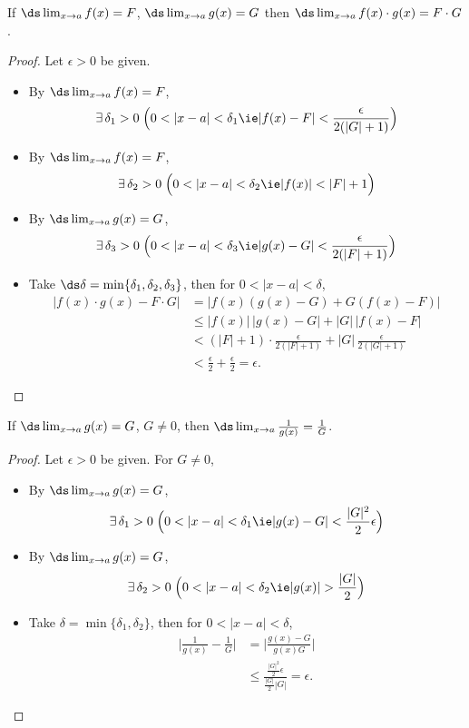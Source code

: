 \begin{theorem}
  If $\ds\lim_{x\to a}f(x) = F$, $\ds\lim_{x\to a}g(x) = G$ then $\ds\lim_{x\to a} f(x)\cdot g(x) = F\cdot G$.
\end{theorem}
\begin{proof}
  Let $\epsilon > 0$ be given.
  \begin{itemize}
    \item By $\ds\lim_{x\to a}f(x) = F$, $$\exists\,\delta_1 > 0\;\Big(0 < |x - a| < \delta_1 \ie |f(x) - F| < \frac{\epsilon}{2(|G| + 1)}\Big)$$
    \item By $\ds\lim_{x\to a}f(x) = F$, $$\exists\,\delta_2 > 0\;\Big(0 < |x - a| < \delta_2 \ie |f(x)| < |F| + 1\Big)$$
    \item By $\ds\lim_{x\to a}g(x) = G$, $$\exists\,\delta_3 > 0\;\Big(0 < |x - a| < \delta_3 \ie |g(x) - G| < \frac{\epsilon}{2(|F| + 1)}\Big)$$
    \item Take $\ds\delta = \min\{\delta_1, \delta_2, \delta_3\}$, then for $ 0 < |x - a| < \delta$,
      \begin{align*}
        |f(x)\cdot g(x) - F\cdot G| &= |f(x)(g(x) - G) + G(f(x) - F)| \\
        &\leqslant |f(x)|\,|g(x) - G| + |G|\,|f(x) - F|\\
        &< (|F| + 1)\cdot\frac{\epsilon}{2(|F| + 1)} + |G|\,\frac{\epsilon}{2(|G| + 1)}\\
        &< \frac{\epsilon}{2} + \frac{\epsilon}{2} = \epsilon.
      \end{align*}
  \end{itemize}
\end{proof}
\begin{theorem}
  If $\ds\lim_{x\to a}g(x) = G$, $G\ne 0$, then $\ds\lim_{x\to a}\frac{1}{g(x)} = \frac{1}{G}$.
\end{theorem}
\begin{proof}
  Let $\epsilon > 0$ be given. For $G\ne 0$,
  \begin{itemize}
    \item By $\ds\lim_{x\to a}g(x) = G$, $$\exists\,\delta_1 > 0\;\Big(0 < |x - a| < \delta_1 \ie |g(x) - G| < \frac{|G|^2}{2}\epsilon\Big)$$
    \item By $\ds\lim_{x\to a}g(x) = G$, $$\exists\,\delta_2 > 0\;\Big(0 < |x - a| < \delta_2 \ie |g(x)| > \frac{|G|}{2}\Big)$$
    \item Take $\delta = \min\{\delta_1, \delta_2\}$, then for $ 0 < |x - a| < \delta$,
      \begin{align*}
        \bigg|\frac{1}{g(x)} - \frac{1}{G}\bigg| &= \bigg|\frac{g(x) - G}{g(x)G}\bigg| \\
        &\leqslant \frac{\frac{|G|^2}{2}\epsilon}{\frac{|G|}{2}|G|} = \epsilon.
      \end{align*}
    \end{itemize}
\end{proof}
